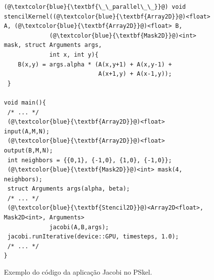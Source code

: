 \begin{figure}[thp] %
\centering          %
\caption*{Exemplo do código da aplicação Jacobi no PSkel.}

\begin{lstlisting}[]
(@\textcolor{blue}{\textbf{\_\_parallel\_\_}}@) void
stencilKernel((@\textcolor{blue}{\textbf{Array2D}}@)<float> A, (@\textcolor{blue}{\textbf{Array2D}}@)<float> B,
             (@\textcolor{blue}{\textbf{Mask2D}}@)<int> mask, struct Arguments args,
             int x, int y){
    B(x,y) = args.alpha * (A(x,y+1) + A(x,y-1) +
                           A(x+1,y) + A(x-1,y));
 }

void main(){
 /* ... */
 (@\textcolor{blue}{\textbf{Array2D}}@)<float> input(A,M,N);
 (@\textcolor{blue}{\textbf{Array2D}}@)<float> output(B,M,N);
 int neighbors = {{0,1}, {-1,0}, {1,0}, {-1,0}};
 (@\textcolor{blue}{\textbf{Mask2D}}@)<int> mask(4, neighbors);
 struct Arguments args(alpha, beta);
 /* ... */
 (@\textcolor{blue}{\textbf{Stencil2D}}@)<Array2D<float>, Mask2D<int>, Arguments>
             jacobi(A,B,args);
 jacobi.runIterative(device::GPU, timesteps, 1.0);
 /* ... */
}
\end{lstlisting}
\end{figure}


